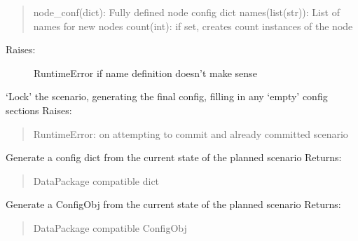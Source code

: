 \documentclass[letterpaper,10pt,english]{sphinxmanual}
\begin{document}
\begin{fulllineitems}
\begin{fulllineitems}
\begin{quote}
node\_conf(dict): Fully defined node config dict
names(list(str)): List of names for new nodes
count(int): if set, creates count instances of the node
\end{quote}
\begin{description}
\item[{Raises:}] \leavevmode
RuntimeError if name definition doesn't make sense

\end{description}

\end{fulllineitems}


\begin{fulllineitems}
\label{index:polybos.Scenario.commit}
`Lock' the scenario, generating the final config, filling in any `empty' config sections
Raises:
\begin{quote}

RuntimeError: on attempting to commit and already committed scenario
\end{quote}

\end{fulllineitems}


\begin{fulllineitems}
\label{index:polybos.Scenario.generate_config}
Generate a config dict from the current state of the planned scenario
Returns:
\begin{quote}

DataPackage compatible dict
\end{quote}

\end{fulllineitems}


\begin{fulllineitems}
\label{index:polybos.Scenario.generate_configobj}
Generate a ConfigObj from the current state of the planned scenario
Returns:
\begin{quote}

DataPackage compatible ConfigObj
\end{quote}

\end{fulllineitems}


\end{fulllineitems}
\end{document}
